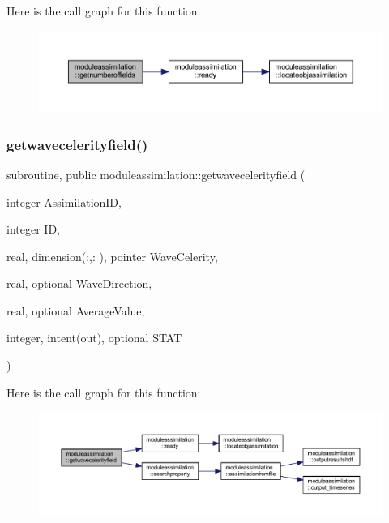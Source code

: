 Here is the call graph for this function\+:\nopagebreak
\begin{figure}[H]
\begin{center}
\leavevmode
\includegraphics[width=350pt]{namespacemoduleassimilation_aea7807de0a1c100aea360d7f4a30e2e5_cgraph}
\end{center}
\end{figure}
\mbox{\label{namespacemoduleassimilation_ae45ed729fac9768fcf97b5c5262c471a}} 
\subsubsection{\texorpdfstring{getwavecelerityfield()}{getwavecelerityfield()}}
{\footnotesize\ttfamily subroutine, public moduleassimilation\+::getwavecelerityfield (\begin{DoxyParamCaption}\item[{integer}]{Assimilation\+ID,  }\item[{integer}]{ID,  }\item[{real, dimension(\+:,\+:  ), pointer}]{Wave\+Celerity,  }\item[{real, optional}]{Wave\+Direction,  }\item[{real, optional}]{Average\+Value,  }\item[{integer, intent(out), optional}]{S\+T\+AT }\end{DoxyParamCaption})}

Here is the call graph for this function\+:\nopagebreak
\begin{figure}[H]
\begin{center}
\leavevmode
\includegraphics[width=350pt]{namespacemoduleassimilation_ae45ed729fac9768fcf97b5c5262c471a_cgraph}
\end{center}
\end{figure}
\mbox{\label{namespacemoduleassimilation_a457aa90cd01b96e0e4a625d41ea9ba78}} 
